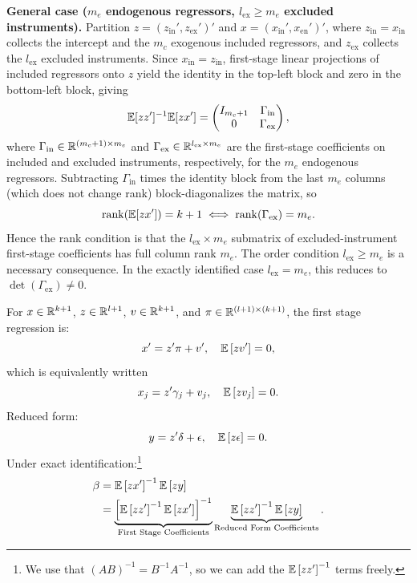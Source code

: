 \begin{remark}
	\textbf{General case ($m_e$ endogenous regressors, $l_{\mathrm{ex}}\ge m_e$ excluded instruments).}
	Partition $z=(z_{\mathrm{in}}',z_{\mathrm{ex}}')'$ and $x=(x_{\mathrm{in}}',x_{\mathrm{en}}')'$, where $z_{\mathrm{in}}=x_{\mathrm{in}}$ collects the intercept and the $m_c$ exogenous included regressors, and $z_{\mathrm{ex}}$ collects the $l_{\mathrm{ex}}$ excluded instruments.
	Since $x_{\mathrm{in}}=z_{\mathrm{in}}$, first-stage linear projections of included regressors onto $z$ yield the identity in the top-left block and zero in the bottom-left block, giving
	\[
		\mathbb{E}[zz']^{-1}\mathbb{E}[zx'] =
		\begin{pmatrix}
			I_{m_c+1} & \Gamma_{\mathrm{in}} \\
			0         & \Gamma_{\mathrm{ex}}
		\end{pmatrix},
	\]
	where $\Gamma_{\mathrm{in}}\in\mathbb{R}^{(m_c+1)\times m_e}$ and $\Gamma_{\mathrm{ex}}\in\mathbb{R}^{l_{\mathrm{ex}}\times m_e}$ are the first-stage coefficients on included and excluded instruments, respectively, for the $m_e$ endogenous regressors.
	Subtracting $\Gamma_{\mathrm{in}}$ times the identity block from the last $m_e$ columns (which does not change rank) block-diagonalizes the matrix, so
	\[
		\operatorname{rank}(\mathbb{E}[zx'])=k+1 \iff \operatorname{rank}(\Gamma_{\mathrm{ex}})=m_e.
	\]
	Hence the rank condition is that the $l_{\mathrm{ex}}\times m_e$ submatrix of excluded-instrument first-stage coefficients has full column rank $m_e$.  The order condition $l_{\mathrm{ex}}\ge m_e$ is a necessary consequence.  In the exactly identified case $l_{\mathrm{ex}}=m_e$, this reduces to $\det(\Gamma_{\mathrm{ex}})\ne 0$.
\end{remark}

\begin{definition}
	For $x \in \mathbb{R}^{k+1}$, $z \in \mathbb{R}^{l+1}$, $v \in \mathbb{R}^{k+1}$, and $\pi \in \mathbb{R}^{(l+1)\times (k+1)}$,
	the first stage regression is: \[
		x' = z'\pi + v', \quad \mathbb{E}\left[zv'\right]=0
	,\]
	which is equivalently written \[
		x_j = z' \gamma_j + v_j, \quad \mathbb{E}\left[z v_j\right] = 0
	.\] 
	Reduced form: \[
		y = z'\delta + \epsilon, \quad \mathbb{E}\left[z\epsilon\right]=0
	.\]
	Under exact identification:\footnote{We use that $\left( AB \right)^{-1} = B^{-1}A^{-1}$, so we can add the $\mathbb{E}\left[zz'\right] ^{-1}$ terms freely.} \begin{align*}
		\beta &= \mathbb{E}\left[zx'\right] ^{-1} \mathbb{E}\left[zy\right] \\
			  &=\underbrace{\left[\mathbb{E}\left[zz'\right]^{-1}\mathbb{E}\left[zx'\right]\right]^{-1}}_{\text{First Stage Coefficients}}\underbrace{\mathbb{E}\left[zz'\right]^{-1}\mathbb{E}\left[zy\right]}_{\text{Reduced Form Coefficients}}
	.\end{align*}
\end{definition}


